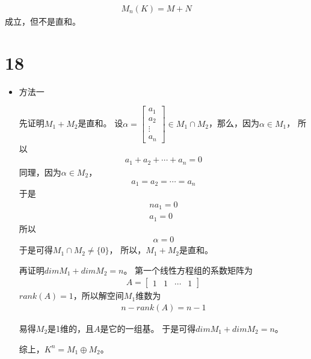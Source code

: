 \documentclass{article}
\begin{document}
\begin{align*}
  M_n(K) = M + N
\end{align*}
成立，但不是直和。

\section*{18}

\begin{itemize}
  \item 方法一

        先证明$M_1 + M_2$是直和。
        设$\alpha = \begin{bmatrix}
            a_1    \\
            a_2    \\
            \vdots \\
            a_n
          \end{bmatrix} \in M_1 \cap M_2$，那么，因为$\alpha \in M_1$，
        所以
        \begin{align*}
          a_1 + a_2 + \cdots + a_n = 0
        \end{align*}
        同理，因为$\alpha \in M_2$，
        \begin{align*}
          a_1 = a_2 = \cdots = a_n
        \end{align*}
        于是
        \begin{align*}
          n a_1 = 0 \\
          a_1 = 0
        \end{align*}
        所以
        \begin{align*}
          \alpha = 0
        \end{align*}
        于是可得$M_1 \cap M_2 \neq \{0\}$，
        所以，$M_1 + M_2$是直和。

        再证明$dim M_1 + dim M_2 = n$。
        第一个线性方程组的系数矩阵为
        \begin{align*}
          A = \begin{bmatrix}
                1 & 1 & \cdots & 1
              \end{bmatrix}
        \end{align*}
        $rank(A) = 1$，所以解空间$M_1$维数为
        \begin{align*}
          n - rank(A) = n - 1
        \end{align*}

        易得$M_2$是1维的，且$A$是它的一组基。
        于是可得$dim M_1 + dim M_2 = n$。

        综上，$K^n = M_1 \oplus M_2$。


\end{itemize}
\end{document}
